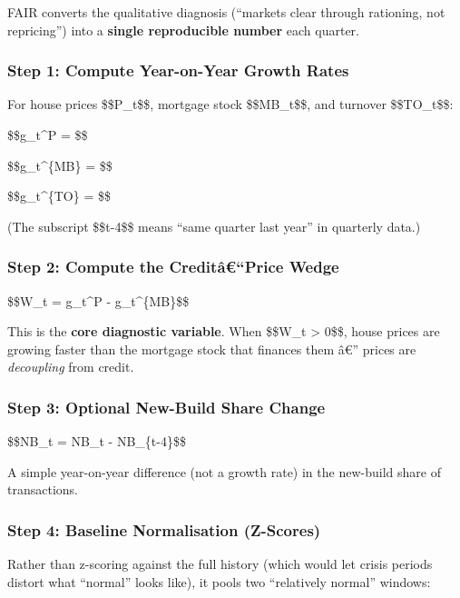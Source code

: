 FAIR converts the qualitative diagnosis (``markets clear through
rationing, not repricing'') into a \textbf{single reproducible number}
each quarter.

\subsubsection{Step 1: Compute Year-on-Year Growth
Rates}\label{step-1-compute-year-on-year-growth-rates}

For house prices \$\$P\_t\$\$, mortgage stock \$\$MB\_t\$\$, and
turnover \$\$TO\_t\$\$:

\$\$g\_t\^{}P = \$\$

\$\$g\_t\^{}\{MB\} = \$\$

\$\$g\_t\^{}\{TO\} = \$\$

(The subscript \$\$t-4\$\$ means ``same quarter last year'' in quarterly
data.)

\subsubsection{Step 2: Compute the Creditâ€``Price
Wedge}\label{step-2-compute-the-credituxe2price-wedge}

\$\$W\_t = g\_t\^{}P - g\_t\^{}\{MB\}\$\$

This is the \textbf{core diagnostic variable}. When \$\$W\_t
\textgreater{} 0\$\$, house prices are growing faster than the mortgage
stock that finances them â€'' prices are \emph{decoupling} from credit.

\subsubsection{Step 3: Optional New-Build Share
Change}\label{step-3-optional-new-build-share-change}

\$\$\Delta NB\_t = NB\_t - NB\_\{t-4\}\$\$

A simple year-on-year difference (not a growth rate) in the new-build
share of transactions.

\subsubsection{Step 4: Baseline Normalisation
(Z-Scores)}\label{step-4-baseline-normalisation-z-scores}

Rather than z-scoring against the full history (which would let crisis
periods distort what ``normal'' looks like), it pools two ``relatively
normal'' windows:


